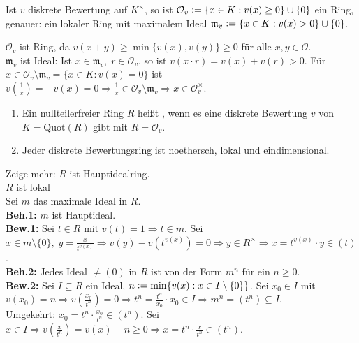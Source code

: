 \documentclass[a4paper, 10pt]{report}
\begin{document}
\begin{Bem}
Ist $v$ diskrete Bewertung auf $K^{\times}$, so ist $\mathcal{O}_v \mathrel{\mathop:}= \{x
\in K: v(x) \geq 0\} \cup \{0\}$ ein Ring, genauer: ein lokaler Ring mit
maximalem Ideal $\mathfrak{m}_v \mathrel{\mathop:}= \{ x \in K: v(x) > 0\} \cup \{0\}$.
\end{Bem}

\begin{Bew} 
$\mathcal{O}_v$ ist Ring, da $v(x+y) \geq \min\{v(x),v(y)\} \geq 0$ für alle
$x,y \in \mathcal{O}$.\\
$\mathfrak{m}_v$ ist Ideal: Ist $x \in \mathfrak{m}_v, \; r \in \mathcal{O}_v$, so ist $v(x \cdot r) =
v(x) + v(r) > 0$. Für $x \in \mathcal{O}_v \setminus \mathfrak{m}_v = \{x \in K: v(x) = 0\}$
ist $v(\frac{1}{x})=-v(x)=0 \Rightarrow \frac{1}{x} \in \mathcal{O}_v\setminus
\mathfrak{m}_v \Rightarrow x \in \mathcal{O}_v^{\times}$.
\end{Bew}

\begin{DefProp}
\label{2.38}
\begin{enumerate}
  \item Ein nullteilerfreier Ring $R$ heißt , wenn es eine diskrete
  Bewertung $v$ von $K = \mathrm{Quot}(R)$ gibt mit $R = \mathcal{O}_v$.
  \item Jeder diskrete Bewertungsring ist noethersch, lokal und eindimensional.
\end{enumerate}
\end{DefProp}

\begin{Bew}
Zeige mehr: $R$ ist Hauptidealring.\\
$R$ ist lokal \chk\\
Sei $m$ das maximale Ideal in $R$.\\
\textbf{Beh.1:} $m$ ist Hauptideal.\\
\textbf{Bew.1:} Sei $t \in R$ mit $v(t)=1 \Rightarrow t \in m$. Sei $x \in m
\setminus\{0\},\; y = \frac{x}{t^{v(x)}} \Rightarrow v(y) - v(t^{v(x)}) = 0
\Rightarrow y \in R^{\times} \Rightarrow x = t^{v(x)} \cdot y \in (t)$.\\
\textbf{Beh.2:} Jedes Ideal $\not= (0)$ in $R$ ist von der Form $m^n$ für ein $n
\geq 0$.\\
\textbf{Bew.2:} Sei $I \subseteq R$ ein Ideal, $n \mathrel{\mathop:}= \min\{v(x): x \in I
\setminus\{0\}\}$. Sei $x_0 \in I$ mit $v(x_0) = n \Rightarrow
v(\frac{x_0}{t^n})=0 \Rightarrow t^n = \frac{t^n}{x_0} \cdot x_0 \in I
\Rightarrow m^n = (t^n) \subseteq I$.\\
Umgekehrt: $x_0 = t^n \cdot \frac{x_0}{t^n} \in (t^n)$. Sei $x \in I \Rightarrow
v(\frac{x}{t^n})=v(x)-n \geq 0 \Rightarrow x = t^n \cdot \frac{x}{t^n}\in (t^n)$.
\end{Bew}
\end{document}
